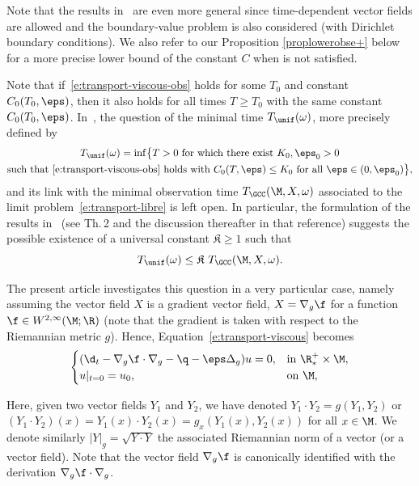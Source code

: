 Note that the results in~\cite{GL:07} are even more general since time-dependent vector fields are allowed and the boundary-value problem is also considered (with Dirichlet boundary conditions). We also refer to our Proposition \ref{proplowerobse+} below for a more precise lower bound of the constant $C$ when \pGCC is not satisfied.

Note that if~\eqref{e:transport-viscous-obs} holds for some $T_0$ and constant $C_0(T_0,\eps)$, then it also holds for all times $T\geq T_0$ with the same constant $C_0(T_0,\eps)$.
In~\cite{GL:07}, the question of the minimal time $T_{\unif}(\omega)$, more precisely defined by
\begin{multline*}
T_{\unif}(\omega) = \inf \bigl\{ T >0 \text{ for which there exist }K_0, \eps_0>0 \\
\text {such that~\eqref{e:transport-viscous-obs} holds with }C_0(T,\eps)\leq K_0 \text{ for all } \eps \in (0,\eps_0) \bigr\},
\end{multline*}
and its link with the minimal observation time $T_{\GCC}(\M,X,\omega)$ associated to the limit problem~\eqref{e:transport-libre} is left open.
In particular, the formulation of the results in~\cite{GL:07} (see \eg Th.\,2 and the discussion thereafter in that reference) suggests the possible existence of a universal constant $\mathfrak{K}\geq 1$ such that
\begin{equation}
\label{e:universal-K}
T_{\unif}(\omega) \leq \mathfrak{K}\ T_{\GCC}(\M,X,\omega).
\end{equation}

The present article investigates this question in a very particular case, namely assuming the vector field $X$ is a gradient vector field, \ie $X= \nabla_g \f$ for a function $\f\in W^{2,\infty}(\M;\R)$ (note that the gradient is taken with respect to the Riemannian metric $g$). Hence, Equation~\eqref{e:transport-viscous} becomes
\begin{equation}
\label{e:transport-viscous-gradient}
\begin{cases}
(\d_t - \nabla_g \f \cdot \nabla_g -\q - \eps \Delta_g ) u = 0, & \text{in } \R^+_*\times \M, \\
u|_{t=0} = u_0, & \text{on } \M,
\end{cases}
\end{equation}

Here, given two vector fields $Y_1$ and $Y_2$, we have denoted $Y_1\cdot Y_2 = g(Y_1,Y_2)$ or $(Y_1\cdot Y_2)(x) = Y_1(x)\cdot Y_2(x) = g_x(Y_1(x),Y_2(x))$ for all $x\in \M$. We denote similarly $|Y|_g = \sqrt{Y \cdot Y}$ the associated Riemannian norm of a vector (or a vector field).
Note that the vector field $\nabla_g \f$ is canonically identified with the derivation $\nabla_g \f \cdot \nabla_g$.

